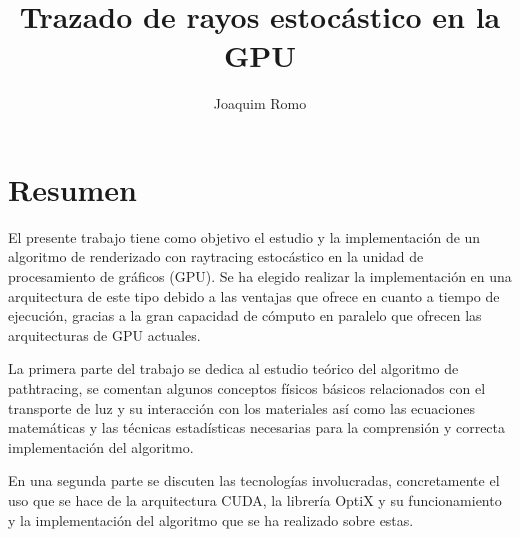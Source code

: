\documentclass[12pt, a4paper,twoside]{tesi_upf}
\title{Trazado de rayos estocástico en la GPU}
\subtitle{}
\author{Joaquim Romo}
\begin{document}
\frontmatter

\maketitle

\cleardoublepage




\section*{\Large \sffamily Resumen}

El presente trabajo tiene como objetivo el estudio y la implementación de un algoritmo de renderizado con raytracing estocástico en la unidad de procesamiento de gráficos (GPU).
Se ha elegido realizar la implementación en una arquitectura de este tipo debido a las ventajas que ofrece en cuanto a tiempo de ejecución, gracias a la gran capacidad de cómputo en paralelo que ofrecen las arquitecturas de GPU actuales.


La primera parte del trabajo se dedica al estudio teórico del algoritmo de pathtracing, se comentan algunos conceptos físicos básicos relacionados con el transporte de luz y su interacción con los materiales así como las ecuaciones matemáticas y las técnicas estadísticas necesarias para la comprensión y correcta implementación del algoritmo.


En una segunda parte se discuten las tecnologías involucradas, concretamente el uso que se hace de la arquitectura CUDA, la librería OptiX y su funcionamiento y la implementación del algoritmo que se ha realizado sobre estas.  


\tableofcontents
\listoffigures

\listoftables


\cleardoublepage

\mainmatter






%









\cleardoublepage







\backmatter
\printindex
\end{document}
